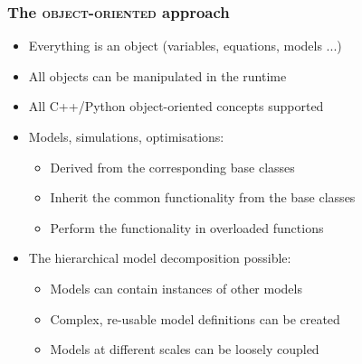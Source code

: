 \documentclass[compress,newPxFont,sthlmFooter]{beamer}
\begin{document}
\begin{frame}
\frametitle{The \textsc{object-oriented} approach}
\begin{itemize}
  \item Everything is an \alert{object} (variables, equations, models ...)
  \item All objects can be \alert{manipulated} in \alert{the runtime}
  \item \alert{All} C++/Python \alert{object-oriented concepts supported}
  \item Models, simulations, optimisations:
     \begin{itemize}
        \item \alert{Derived from} the corresponding \alert{base classes}
        \item \alert{Inherit} the \alert{common functionality} from the base classes
        \item Perform the \alert{functionality} in \alert{overloaded functions}
     \end{itemize}
  \item The \alert{hierarchical model decomposition} possible:
    \begin{itemize}
        \item Models can contain instances of other models
        \item Complex, re-usable model definitions can be created
        \item Models at different scales can be loosely coupled %
    \end{itemize}
\end{itemize}
\end{frame}
\end{document}
